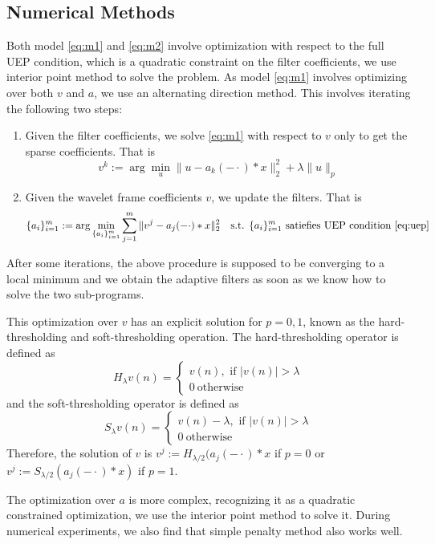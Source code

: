 \documentclass[a4paper]{article}
\begin{document}
{\subsection{Numerical Methods}
Both model \eqref{eq:m1} and \eqref{eq:m2} involve optimization with respect to the full UEP condition, which is a quadratic constraint on the filter coefficients, we use interior point method to solve the problem. As model \eqref{eq:m1} involves optimizing over both $v$ and $a$, we use an alternating direction method. This involves iterating the following two steps:
\begin{enumerate}
	\item Given the filter coefficients, we solve \eqref{eq:m1} with respect to $v$ only to get the sparse coefficients. That is 
		\[
			v^{k} := \arg\min_u \|u-a_k(-\cdot)*x\|_2^2 + \lambda \|u\|_p
		\]
	\item Given the wavelet frame coefficients $v$, we update the filters. That is 
	\[
		\{a_i\}_{i=1}^m :=\arg\min_{\{a_i\}_{i=1}^{m}}  \sum_{j=1}^m \|v^j - a_j(-\cdot)*x\|_2^2 \quad \textrm{s.t. } \{a_i\}_{i=1}^m \textrm{ satiefies UEP condition \eqref{eq:uep}}
	\]
\end{enumerate}
After some iterations, the above procedure is supposed to be converging to a local minimum and we obtain the adaptive filters as soon as we know how to solve the two sub-programs. 

This optimization over $v$ has an explicit solution for $p=0,1$, known as the hard-thresholding and soft-thresholding operation.
The hard-thresholding operator is defined as 
\[
	H_\lambda v(n)=\left\{ \begin{array}{lr}  v(n), \textrm{ if } |v(n)| > \lambda \\0\ \textrm{otherwise}\end{array}\right .
\]
and the soft-thresholding operator is defined as
\[
	S_\lambda v(n)=\left\{ \begin{array}{lr}  v(n)-\lambda, \textrm{ if } |v(n)| > \lambda \\0\ \textrm{otherwise}\end{array}\right .
\]
Therefore, the solution of $v$ is $v^j:=H_{\lambda/2}(a_j(-\cdot)*x$ if $p=0$ or $v^j:=S_{\lambda/2}(a_j(-\cdot)*x)$ if $p=1$.

The optimization over $a$ is more complex, recognizing it as a quadratic constrained optimization, we use the interior point method to solve it. During numerical experiments, we also find that simple penalty method also works well.


}
\end{document}
